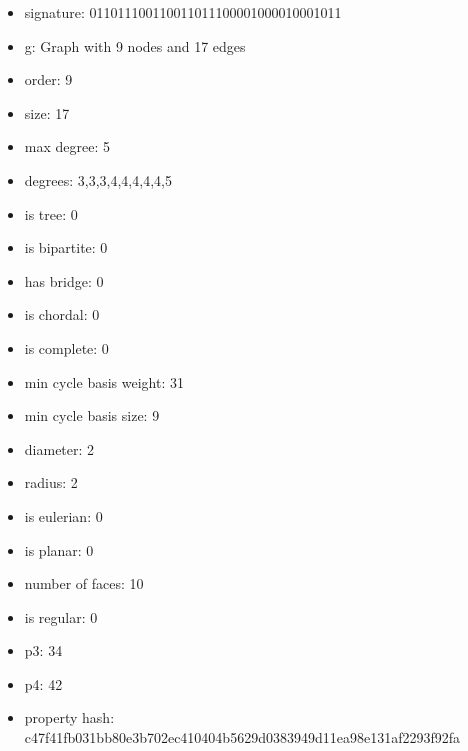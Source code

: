 \newpage
\begin{figure}
\end{figure}
\begin{itemize}
\item signature: 011011100110011011100001000010001011
\item g: Graph with 9 nodes and 17 edges
\item order: 9
\item size: 17
\item max degree: 5
\item degrees: 3,3,3,4,4,4,4,4,5
\item is tree: 0
\item is bipartite: 0
\item has bridge: 0
\item is chordal: 0
\item is complete: 0
\item min cycle basis weight: 31
\item min cycle basis size: 9
\item diameter: 2
\item radius: 2
\item is eulerian: 0
\item is planar: 0
\item number of faces: 10
\item is regular: 0
\item p3: 34
\item p4: 42
\item property hash: c47f41fb031bb80e3b702ec410404b5629d0383949d11ea98e131af2293f92fa
\end{itemize}
